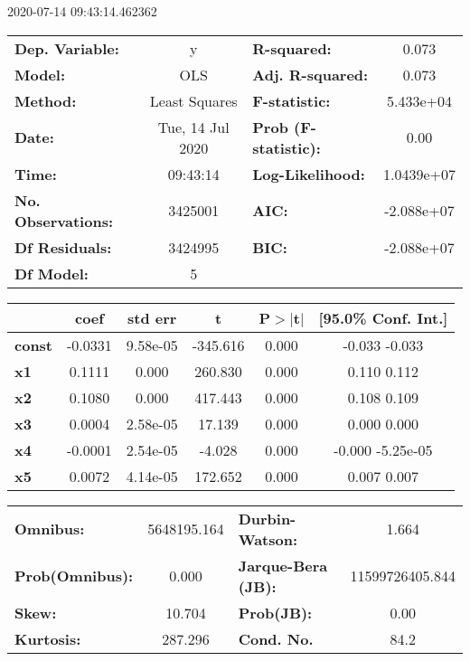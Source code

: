 
2020-07-14 09:43:14.462362
\begin{center}
\begin{tabular}{lclc}
\toprule
\textbf{Dep. Variable:}    &        y         & \textbf{  R-squared:         } &        0.073     \\
\textbf{Model:}            &       OLS        & \textbf{  Adj. R-squared:    } &        0.073     \\
\textbf{Method:}           &  Least Squares   & \textbf{  F-statistic:       } &    5.433e+04     \\
\textbf{Date:}             & Tue, 14 Jul 2020 & \textbf{  Prob (F-statistic):} &        0.00      \\
\textbf{Time:}             &     09:43:14     & \textbf{  Log-Likelihood:    } &    1.0439e+07    \\
\textbf{No. Observations:} &     3425001      & \textbf{  AIC:               } &    -2.088e+07    \\
\textbf{Df Residuals:}     &     3424995      & \textbf{  BIC:               } &    -2.088e+07    \\
\textbf{Df Model:}         &           5      & \textbf{                     } &                  \\
\bottomrule
\end{tabular}
\begin{tabular}{lccccc}
               & \textbf{coef} & \textbf{std err} & \textbf{t} & \textbf{P$>$$|$t$|$} & \textbf{[95.0\% Conf. Int.]}  \\
\midrule
\textbf{const} &      -0.0331  &     9.58e-05     &  -345.616  &         0.000        &        -0.033    -0.033       \\
\textbf{x1}    &       0.1111  &        0.000     &   260.830  &         0.000        &         0.110     0.112       \\
\textbf{x2}    &       0.1080  &        0.000     &   417.443  &         0.000        &         0.108     0.109       \\
\textbf{x3}    &       0.0004  &     2.58e-05     &    17.139  &         0.000        &         0.000     0.000       \\
\textbf{x4}    &      -0.0001  &     2.54e-05     &    -4.028  &         0.000        &        -0.000 -5.25e-05       \\
\textbf{x5}    &       0.0072  &     4.14e-05     &   172.652  &         0.000        &         0.007     0.007       \\
\bottomrule
\end{tabular}
\begin{tabular}{lclc}
\textbf{Omnibus:}       & 5648195.164 & \textbf{  Durbin-Watson:     } &        1.664     \\
\textbf{Prob(Omnibus):} &     0.000   & \textbf{  Jarque-Bera (JB):  } & 11599726405.844  \\
\textbf{Skew:}          &    10.704   & \textbf{  Prob(JB):          } &         0.00     \\
\textbf{Kurtosis:}      &   287.296   & \textbf{  Cond. No.          } &         84.2     \\
\bottomrule
\end{tabular}
\end{center}
